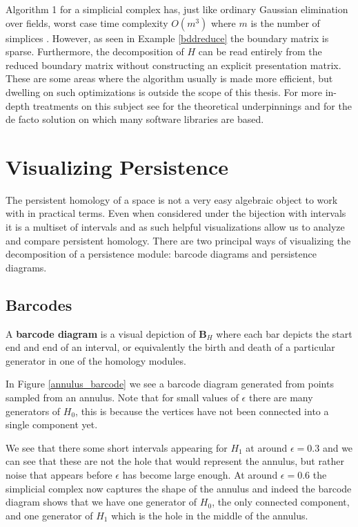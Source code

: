 Algorithm 1 for a simplicial complex has, just like ordinary Gaussian elimination over fields, worst case time complexity $O(m^{3})$ where $m$ is the  number of simplices \cite{Zomorodian2005}. However, as seen in Example \ref{bddreduce} the boundary matrix is sparse. Furthermore, the decomposition of $H$ can be read entirely from the reduced boundary matrix without constructing an explicit presentation matrix. These are some areas where the algorithm usually is made more efficient, but dwelling on such optimizations is outside the scope of this thesis. For more in-depth treatments on this subject see  \cite{edels} for the theoretical underpinnings and \cite{ripser} for the de facto solution on which many software libraries are based.


\section{Visualizing Persistence}
The persistent homology of a space is not a very easy algebraic object to work with in practical terms. Even when considered under the bijection with intervals it is a multiset of intervals and as such helpful visualizations allow us to analyze and compare persistent homology. There are two principal ways of visualizing the decomposition of a persistence module: barcode diagrams and persistence diagrams.

\subsection{Barcodes}
A \textbf{barcode diagram} is a visual depiction of $\textbf{B}_{H}$ where each bar depicts the start end and end of an interval, or equivalently the birth and death of a particular generator in one of the homology modules.

In Figure \ref{annulus_barcode} we see a barcode diagram generated from points sampled from an annulus. Note that for small values of $\epsilon$ there are many generators of $H_{0}$, this is because the vertices have not been connected into a single component yet.

  We see that there some short intervals appearing for $H_{1}$ at around $\epsilon=0.3$ and we can see that these are not the hole that would represent the annulus, but rather noise that appears before $\epsilon$ has become large enough. At around $\epsilon=0.6$ the simplicial complex now captures the shape of the annulus and indeed the barcode diagram shows that we have one generator of $H_{0}$, the only connected component, and one generator of $H_{1}$ which is the hole in the middle of the annulus.

